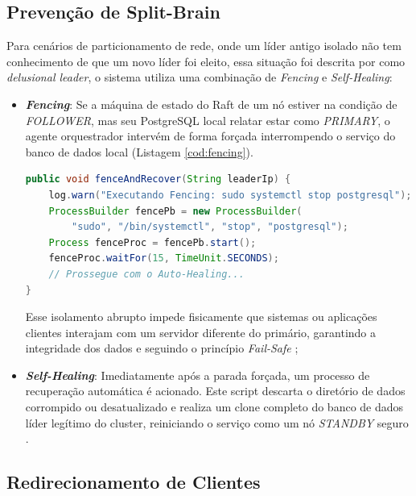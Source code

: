         \subsection{Prevenção de Split-Brain}
            Para cenários de particionamento de rede, onde um líder antigo isolado não tem conhecimento de que um novo líder foi eleito, essa situação foi descrita por  como \textit{delusional leader}, o sistema utiliza uma combinação de \textit{Fencing} e \textit{Self-Healing}:
        
            \begin{itemize}
                \item \textbf{\textit{Fencing}}: Se a máquina de estado do Raft de um nó estiver na condição de \textit{FOLLOWER}, mas seu PostgreSQL local relatar estar como \textit{PRIMARY}, o agente orquestrador intervém de forma forçada interrompendo o serviço do banco de dados local (Listagem \ref{cod:fencing}). 

\begin{lstlisting}[language=Java, caption={Execução do Fencing acionando o sistema operacional}, label={cod:fencing}]
public void fenceAndRecover(String leaderIp) {
    log.warn("Executando Fencing: sudo systemctl stop postgresql");
    ProcessBuilder fencePb = new ProcessBuilder(
        "sudo", "/bin/systemctl", "stop", "postgresql");
    Process fenceProc = fencePb.start();
    fenceProc.waitFor(15, TimeUnit.SECONDS);
    // Prossegue com o Auto-Healing...
}
\end{lstlisting}

                Esse isolamento abrupto impede fisicamente que sistemas ou aplicações clientes interajam com um servidor diferente do primário, garantindo a integridade dos dados e seguindo o princípio \textit{Fail-Safe} \cite{kleppmann2017designing};
                
                \item \textbf{\textit{Self-Healing}}: Imediatamente após a parada forçada,  um processo de recuperação automática é acionado. Este script descarta o diretório de dados corrompido ou desatualizado e realiza um clone completo do banco de dados líder legítimo do cluster, reiniciando o serviço como um nó \textit{STANDBY} seguro \cite{toeroe2012service}.
            \end{itemize}

        \subsection{Redirecionamento de Clientes}
        
